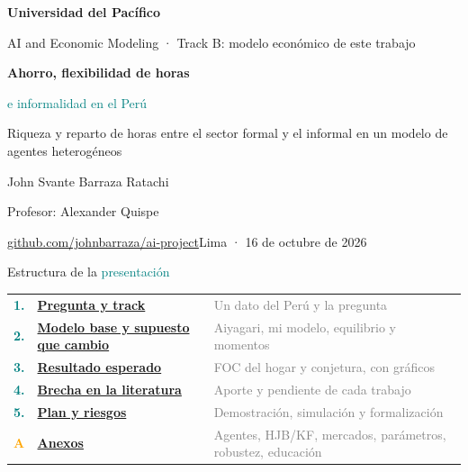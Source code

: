 \documentclass[aspectratio=169,11pt]{beamer}
\newcommand{\teal}[1]{\textcolor{Teal}{#1}}
\newcommand{\partid}{0}
\begin{document}
\begin{frame}[plain]
\vspace{6mm}
{\small\bfseries\color{Blue}Universidad del Pacífico}\par
{\small AI and Economic Modeling · Track B: modelo económico de este trabajo}\par
\vspace{11mm}
{\LARGE\bfseries Ahorro, flexibilidad de horas\par\vspace{1.5mm}\teal{e informalidad en el Perú}\par}
\vspace{4mm}
{\large Riqueza y reparto de horas entre el sector formal y el informal en un modelo de agentes heterogéneos}\par
\vspace{9mm}
{\large John Svante Barraza Ratachi}\par
\vspace{1mm}
{\small Profesor: Alexander Quispe}\par
\vspace{8mm}
{\small\href{https://github.com/johnbarraza/ai-project}{github.com/johnbarraza/ai-project}\hfill Lima · 16 de octubre de 2026}
\end{frame}

\renewcommand{\partid}{0}
\begin{frame}{Estructura de la \teal{presentación}}
\vspace{2mm}
\renewcommand{\arraystretch}{1.9}
\begin{tabular}{@{}lll@{}}
\textcolor{Teal}{\textbf{1.}} & \hyperlink{parte1}{\textbf{Pregunta y track}} & \textcolor{Gray}{Un dato del Perú y la pregunta}\\
\textcolor{Teal}{\textbf{2.}} & \hyperlink{parte2}{\textbf{Modelo base y supuesto que cambio}} & \textcolor{Gray}{Aiyagari, mi modelo, equilibrio y momentos}\\
\textcolor{Teal}{\textbf{3.}} & \hyperlink{parte3}{\textbf{Resultado esperado}} & \textcolor{Gray}{FOC del hogar y conjetura, con gráficos}\\
\textcolor{Teal}{\textbf{4.}} & \hyperlink{parte4}{\textbf{Brecha en la literatura}} & \textcolor{Gray}{Aporte y pendiente de cada trabajo}\\
\textcolor{Teal}{\textbf{5.}} & \hyperlink{parte5}{\textbf{Plan y riesgos}} & \textcolor{Gray}{Demostración, simulación y formalización}\\
\textcolor{Orange}{\textbf{A}} & \hyperlink{anexos}{\textbf{Anexos}} & \textcolor{Gray}{Agentes, HJB/KF, mercados, parámetros, robustez, educación}\\
\end{tabular}
\end{frame}
\end{document}
